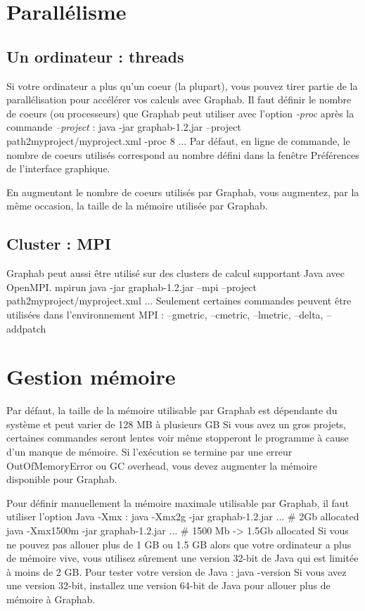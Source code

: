 \documentclass[a4paper,10pt]{report}
\newenvironment{cmd}
{\quote\Verbatim}
{\endVerbatim\endquote}
\begin{document}
\section{Parallélisme}
\subsection{Un ordinateur : threads}
Si votre ordinateur a plus qu'un coeur (la plupart), vous pouvez tirer partie de la parallélisation pour accélérer vos calculs avec Graphab.
Il faut définir le nombre de coeurs (ou processeurs) que Graphab peut utiliser avec l'option \textit{-proc} après la commande \textit{--project} :
\begin{cmd}
java -jar graphab-1.2.jar --project path2myproject/myproject.xml -proc 8 ...
\end{cmd}
Par défaut, en ligne de commande, le nombre de coeurs utilisés correspond au nombre défini dans la fenêtre Préférences de l'interface graphique.

En augmentant le nombre de coeurs utilisés par Graphab, vous augmentez, par la même occasion, la taille de la mémoire utilisée par Graphab.

\subsection{Cluster : MPI}
Graphab peut aussi être utilisé sur des clusters de calcul supportant Java avec OpenMPI.
\begin{cmd}
mpirun java -jar graphab-1.2.jar --mpi --project path2myproject/myproject.xml ...
\end{cmd}
Seulement certaines commandes peuvent être utilisées dans l'environnement MPI : --gmetric, --cmetric, --lmetric, --delta, --addpatch

\section{Gestion mémoire}
Par défaut, la taille de la mémoire utilisable par Graphab est dépendante du système et peut varier de 128 MB à plusieurs GB
Si vous avez un gros projets, certaines commandes seront lentes voir même stopperont le programme à cause d'un manque de mémoire.
Si l'exécution se termine par une erreur OutOfMemoryError ou GC overhead, vous devez augmenter la mémoire disponible pour Graphab.

Pour définir manuellement la mémoire maximale utilisable par Graphab, il faut utiliser l'option Java -Xmx :
\begin{cmd}
java -Xmx2g -jar graphab-1.2.jar ... # 2Gb allocated
java -Xmx1500m -jar graphab-1.2.jar ... # 1500 Mb -> 1.5Gb allocated
\end{cmd}
Si vous ne pouvez pas allouer plus de 1 GB ou 1.5 GB alors que votre ordinateur a plus de mémoire vive, vous utilisez sûrement une version 32-bit de Java qui est limitée à moins de 2 GB.
Pour tester votre version de Java :
\begin{cmd}
java -version
\end{cmd}
Si vous avez une version 32-bit, installez une version 64-bit de Java pour allouer plus de mémoire à Graphab.
\end{document}

